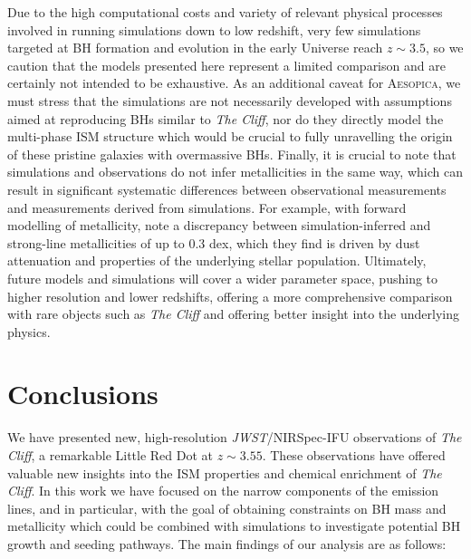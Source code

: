 \documentclass[fleqn,usenatbib]{mnras}
\newcommand{\jwst}{\textit{JWST}\xspace}
\newcommand{\Hbeta}{\text{H\textbeta}\xspace}
\newcommand{\OIIIall}{\forbiddenEL[O][iii][\textlambda][\textlambda][4959,][5007]}
\newcommand{\cliff}{\textit{The Cliff}\xspace}
\begin{document}
Due to the high computational costs and variety of relevant physical processes involved in running simulations down to low redshift, very few simulations targeted at BH formation and evolution in the early Universe reach $z\sim3.5$, so we caution that the models presented here represent a limited comparison and are certainly not intended to be exhaustive. 
As an additional caveat for \textsc{Aesopica}, we must stress that the simulations are not necessarily developed with assumptions aimed at reproducing BHs similar to \cliff, nor do they directly model the multi-phase ISM structure which would be crucial to fully unravelling the origin of these pristine galaxies with overmassive BHs.
Finally, it is crucial to note that simulations and observations do not infer metallicities in the same way, which can result in significant systematic differences between observational measurements and measurements derived from simulations. 
For example, with forward modelling of metallicity, \cite{PayyoorVijayan2026} note a discrepancy between simulation-inferred and strong-line metallicities of up to 0.3 dex, which they find is driven by dust attenuation and properties of the underlying stellar population.
Ultimately, future models and simulations will cover a wider parameter space, pushing to higher resolution and lower redshifts, offering a more comprehensive comparison with rare objects such as \cliff and offering better insight into the underlying physics.


\section{Conclusions}\label{sec:Conclusions}
We have presented new, high-resolution \jwst/NIRSpec-IFU observations of \cliff, a remarkable Little Red Dot at $z\sim3.55$. These observations have offered valuable new insights into the ISM properties and chemical enrichment of \cliff. In this work we have focused on the narrow components of the emission lines, \Hbeta and \OIIIall in particular, with the goal of obtaining constraints on BH mass and metallicity which could be combined with simulations to investigate potential BH growth and seeding pathways. The main findings of our analysis are as follows:
\end{document}
